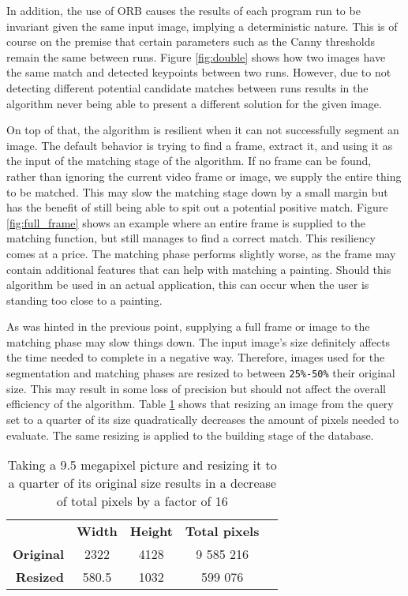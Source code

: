 In addition, the use of ORB causes the results of each program run to be invariant given the same input image, implying a deterministic nature. This is of course on the premise that certain parameters such as the Canny thresholds remain the same between runs. Figure \ref{fig:double} shows how two images have the same match and detected keypoints between two runs. However, due to not detecting different potential candidate matches between runs results in the algorithm never being able to present a different solution for the given image.


On top of that, the algorithm is resilient when it can not successfully segment an image. The default behavior is trying to find a frame, extract it, and using it as the input of the matching stage of the algorithm. If no frame can be found, rather than ignoring the current video frame or image, we supply the entire thing to be matched. This may slow the matching stage down by a small margin but has the benefit of still being able to spit out a potential positive match. Figure \ref{fig:full_frame} shows an example where an entire frame is supplied to the matching function, but still manages to find a correct match. This resiliency comes at a price. The matching phase performs slightly worse, as the frame may contain additional features that can help with matching a painting. Should this algorithm be used in an actual application, this can occur when the user is standing too close to a painting. 


As was hinted in the previous point, supplying a full frame or image to the matching phase may slow things down. The input image's size definitely affects the time needed to complete in a negative way. Therefore, images used for the segmentation and matching phases are resized to between \verb|25%-50%| their original size. This may result in some loss of precision but should not affect the overall efficiency of the algorithm. Table \ref{tab:quadratic} shows that resizing an image from the query set to a quarter of its size quadratically decreases the amount of pixels needed to evaluate. The same resizing is applied to the building stage of the database.

\begin{table}[]
	\centering
	\begin{tabular}{rcccl}
		\multicolumn{1}{l}{} & \textbf{Width} & \textbf{Height} & \textbf{Total pixels} &  \\
		\textbf{Original}    & 2322           & 4128            & 9 585 216             &  \\
		\textbf{Resized}     & 580.5          & 1032            & 599 076               & 
	\end{tabular}
	\caption{Taking a 9.5 megapixel picture and resizing it to a quarter of its original size results in a decrease of total pixels by a factor of 16}
	\label{tab:quadratic}
\end{table}


